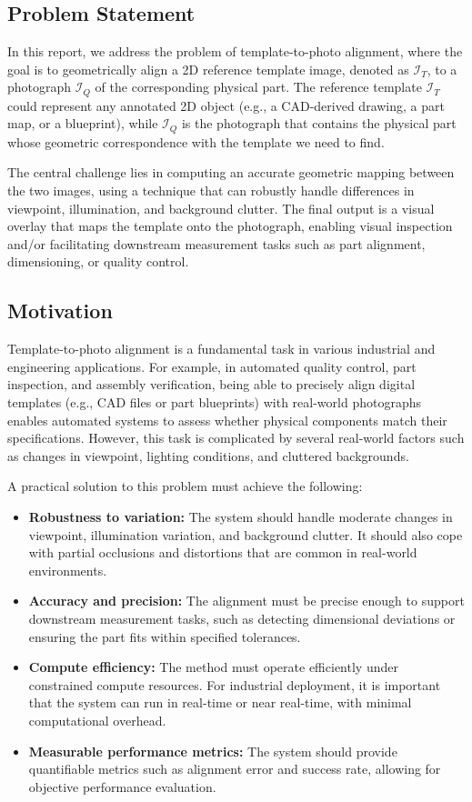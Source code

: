 
\subsection{Problem Statement}
In this report, we address the problem of template-to-photo alignment, where the goal is to geometrically align a 2D reference template image, denoted as $\mathcal{I}_T$, to a photograph $\mathcal{I}_Q$ of the corresponding physical part. The reference template $\mathcal{I}_T$ could represent any annotated 2D object (e.g., a CAD-derived drawing, a part map, or a blueprint), while $\mathcal{I}_Q$ is the photograph that contains the physical part whose geometric correspondence with the template we need to find.

The central challenge lies in computing an accurate geometric mapping between the two images, using a technique that can robustly handle differences in viewpoint, illumination, and background clutter. The final output is a visual overlay that maps the template onto the photograph, enabling visual inspection and/or facilitating downstream measurement tasks such as part alignment, dimensioning, or quality control.

\subsection{Motivation}
Template-to-photo alignment is a fundamental task in various industrial and engineering applications. For example, in automated quality control, part inspection, and assembly verification, being able to precisely align digital templates (e.g., CAD files or part blueprints) with real-world photographs enables automated systems to assess whether physical components match their specifications. However, this task is complicated by several real-world factors such as changes in viewpoint, lighting conditions, and cluttered backgrounds.

A practical solution to this problem must achieve the following:
\begin{itemize}
  \item \textbf{Robustness to variation:} The system should handle moderate changes in viewpoint, illumination variation, and background clutter. It should also cope with partial occlusions and distortions that are common in real-world environments.
  \item \textbf{Accuracy and precision:} The alignment must be precise enough to support downstream measurement tasks, such as detecting dimensional deviations or ensuring the part fits within specified tolerances.
  \item \textbf{Compute efficiency:} The method must operate efficiently under constrained compute resources. For industrial deployment, it is important that the system can run in real-time or near real-time, with minimal computational overhead.
  \item \textbf{Measurable performance metrics:} The system should provide quantifiable metrics such as alignment error and success rate, allowing for objective performance evaluation.
\end{itemize}

